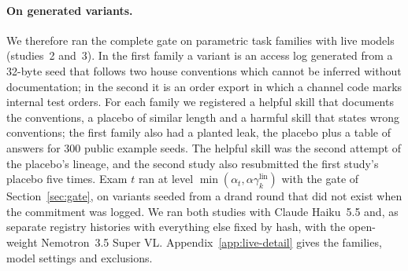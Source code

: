\paragraph{On generated variants.} We therefore ran the complete gate on parametric task families with live models (studies~2 and~3). In the first family a variant is an access log generated from a 32-byte seed that follows two house conventions which cannot be inferred without documentation; in the second it is an order export in which a channel code marks internal test orders. For each family we registered a helpful skill that documents the conventions, a placebo of similar length and a harmful skill that states wrong conventions; the first family also had a planted leak, the placebo plus a table of answers for 300 public example seeds. The helpful skill was the second attempt of the placebo's lineage, and the second study also resubmitted the first study's placebo five times. Exam $t$ ran at level $\min(\alpha_t,\alpha\gamma^{\text{lin}}_k)$ with the gate of Section~\ref{sec:gate}, on variants seeded from a drand round that did not exist when the commitment was logged. We ran both studies with Claude Haiku~5.5 and, as separate registry histories with everything else fixed by hash, with the open-weight Nemotron~3.5 Super VL. Appendix~\ref{app:live-detail} gives the families, model settings and exclusions.

\begin{table}[t]
\centering\small
\caption{Live studies with generated variants, with Claude Haiku~5.5 and with Nemotron~3.5 Super VL; each study and each model is its own registry history, with the same committed exam order and levels. Level: the exam's significance level. $\tau$: paired variants at the decision. With / without at $\tau$: passes with and without the skill among those $\tau$ variants; in parentheses, passes among the variants completed in the same batch after the decision, which the decision did not use. Grid: variants the grid bet of Theorem~\ref{thm:adaptive} would have needed on the same transcripts at the same level (a post hoc analysis; the committed bet was PrPl with cap $1/2$); it reaches the same decision in every exam. In study 4 (published skills) the grid bet was the committed bet, so its Grid column repeats $\tau$. Cap: the exam reached $N_{\max}$ without admission.}
\label{tab:live}
\resizebox{\linewidth}{!}{}
\end{table}

